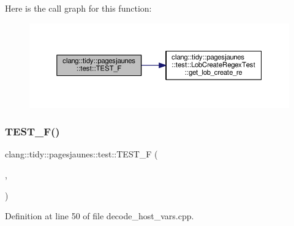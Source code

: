 Here is the call graph for this function\+:
\nopagebreak
\begin{figure}[H]
\begin{center}
\leavevmode
\includegraphics[width=350pt]{namespaceclang_1_1tidy_1_1pagesjaunes_1_1test_a323364914c7bbb949edba7c8e6080598_cgraph}
\end{center}
\end{figure}
\mbox{\label{namespaceclang_1_1tidy_1_1pagesjaunes_1_1test_aeb03cd64c4a45d216a71b1b17a9aed3e}} 
\subsubsection{\texorpdfstring{T\+E\+S\+T\+\_\+\+F()}{TEST\_F()}\hspace{0.1cm}{\footnotesize\ttfamily [13/57]}}
{\footnotesize\ttfamily clang\+::tidy\+::pagesjaunes\+::test\+::\+T\+E\+S\+T\+\_\+F (\begin{DoxyParamCaption}\item[{\hyperlink{classclang_1_1tidy_1_1pagesjaunes_1_1test_1_1_decode_host_vars_test}{Decode\+Host\+Vars\+Test}}]{,  }\item[{Decode\+Host\+Vars\+Basic}]{ }\end{DoxyParamCaption})}



Definition at line 50 of file decode\+\_\+host\+\_\+vars.\+cpp.

